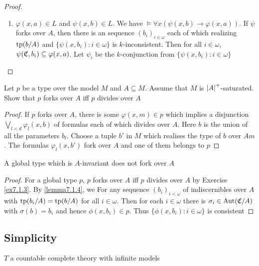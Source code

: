 \documentclass[11pt]{article}
\begin{document}
\begin{proof}
\begin{enumerate}
\item \(\varphi(x,a)\in L\) and \(\psi(x,b)\in L\). We have \(\vDash\forall x(\psi(x,b)\to\varphi(x,a))\). If \(\psi\) forks over \(A\), then
there is an sequence \((b_i)_{i\in\omega}\) each of which realizing \(\operatorname{tp}(b/A)\)
and \(\{\psi(x,b_i):i\in\omega\}\) is \(k\)-inconsistent. Then for all \(i\in\omega\), \(\psi(\mathfrak{C},b_i)\subseteq\varphi(x,a)\).
Let \(\psi_i\) be the \(k\)-conjunction from \(\{\psi(x,b_i):i\in\omega\}\)
\end{enumerate}
\end{proof}

\begin{exercise}
\label{ex7.1.3}
Let \(p\) be a type over the model \(M\) and \(A\subseteq M\). Assume that \(M\)
is \(\abs{A}^+\)-saturated. Show that \(p\) forks over \(A\) iff \(p\) divides over \(A\)
\end{exercise}

\begin{proof}
If \(p\) forks over \(A\), there is some \(\varphi(x,m)\in p\) which implies a
disjunction \(\bigvee_{l<d}\varphi_l(x,b)\) of formulas each of which divides over \(A\).
Here \(b\) is the union of all the parameters \(b_l\).
Choose a tuple \(b'\) in \(M\) which realises the type of \(b\) over \(Am\). The
formulas \(\varphi_l(x,b')\) fork over \(A\) and one of them belongs to \(p\)
\end{proof}

\begin{exercise}
\label{ex7.1.4}
A global type which is \(A\)-invariant does not fork over \(A\)
\end{exercise}

\begin{proof}
For a global type \(p\), \(p\) forks over \(A\) iff \(p\) divides over \(A\) by Exercise
\ref{ex7.1.3}. By \ref{lemma7.1.4}, we
For any sequence \((b_i)_{i<\omega}\) of indiscernibles over \(A\) with \(\operatorname{tp}(b_i/A)=\operatorname{tp}(b/A)\) for all
\(i\in\omega\). Then for each \(i\in\omega\) there is \(\sigma_i\in\operatorname{\text{Aut}}(\mathfrak{C}/A)\) with \(\sigma(b)=b_i\) and
hence \(\phi(x,b_i)\in p\). Thus \(\{\phi(x,b_i):i\in\omega\}\) is consistent
\end{proof}
\subsection{Simplicity}
\label{sec:org3159b25}
\(T\) a countable complete theory with infinite models
\end{document}
